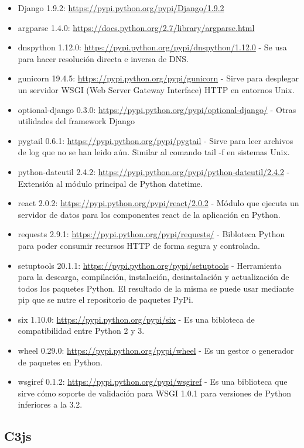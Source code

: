 \begin{itemize}
  \item Django 1.9.2: \url{https://pypi.python.org/pypi/Django/1.9.2}
  \item argparse 1.4.0: \url{https://docs.python.org/2.7/library/argparse.html}
  \item dnspython 1.12.0: \url{https://pypi.python.org/pypi/dnspython/1.12.0} - Se usa para hacer resolución directa e inversa de DNS.
  \item gunicorn 19.4.5: \url{https://pypi.python.org/pypi/gunicorn} - Sirve para desplegar un servidor WSGI (Web Server Gateway Interface) HTTP en entornos Unix.
  \item optional-django 0.3.0: \url{https://pypi.python.org/pypi/optional-django/} - Otras utilidades del framework Django
  \item pygtail 0.6.1: \url{https://pypi.python.org/pypi/pygtail} - Sirve para leer archivos de log que no se han leido aún. Similar al comando tail -f en sistemas Unix.
  \item python-dateutil 2.4.2: \url{https://pypi.python.org/pypi/python-dateutil/2.4.2} - Extensión al módulo principal de Python datetime.
  \item react 2.0.2: \url{https://pypi.python.org/pypi/react/2.0.2} - Módulo que ejecuta un servidor de datos para los componentes react de la aplicación en Python.
  \item requests 2.9.1: \url{https://pypi.python.org/pypi/requests/} - Bibloteca Python para poder consumir recursos HTTP de forma segura y controlada.
  \item setuptools 20.1.1: \url{https://pypi.python.org/pypi/setuptools} - Herramienta para la descarga, compilación, instalación, desinstalación y actualización de todos los paquetes Python. El resultado de la misma se puede usar mediante pip que se nutre el repositorio de paquetes PyPi.
  \item six 1.10.0: \url{https://pypi.python.org/pypi/six} - Es una bibloteca de compatibilidad entre Python 2 y 3.
  \item wheel 0.29.0: \url{https://pypi.python.org/pypi/wheel} - Es un gestor o generador de paquetes en Python.
  \item wsgiref 0.1.2: \url{https://pypi.python.org/pypi/wsgiref} - Es una biblioteca que sirve cómo soporte de validación para WSGI 1.0.1 para versiones de Python inferiores a la 3.2.
\end{itemize}

\subsection{C3js}

